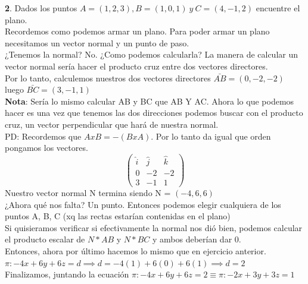 \documentclass[10pt,a4paper]{article}
\begin{document}
\textbf{2}. Dados los puntos $A=(1, 2, 3), B=(1,0,1) \ y \ C=(4, -1, 2)$ encuentre el plano. \\
Recordemos como podemos armar un plano. Para poder armar un plano necesitamos un vector normal y un punto de paso. \\
¿Tenemos la normal? No. ¿Como podemos calcularla? La manera de calcular un vector normal sería hacer el producto cruz entre dos vectores directores. \\
Por lo tanto, calculemos nuestros dos vectores directores $ \bar{AB} = (0, -2, -2)$ luego $\bar{BC} = (3, -1, 1)$ \\
\textbf{Nota}: Sería lo mismo calcular AB y BC que AB Y AC.
Ahora lo que podemos hacer es una vez que tenemos las dos direcciones podemos buscar con el producto cruz, un vector perpendicular que hará de nuestra normal. \\
PD: Recordemos que $A x B = - (B x A)$. Por lo tanto da igual que orden pongamos los vectores.
\[
\begin{pmatrix}
\hat{i} & \hat{j} & \hat{k} \\
0 & -2 & -2\\
3 & -1 & 1
\end{pmatrix}
\]
Nuestro vector normal N termina siendo N = $(-4, 6, 6)$ \\
¿Ahora qué nos falta? Un punto. Entonces podemos elegir cualquiera de los puntos A, B, C (xq las rectas estarían contenidas en el plano) \\
Si quisieramos verificar si efectivamente la normal nos dió bien, podemos calcular el producto escalar de $N * AB$ y $N * BC$ y ambos deberían dar 0. \\
Entonces, ahora por último hacemos lo mismo que en ejercicio anterior. $\pi:-4x+6y+6z=d \implies d=-4(1)+6(0)+6(1) \implies d = 2$ \\
Finalizamos, juntando la ecuación $\pi:-4x+6y+6z=2 \equiv \pi:-2x+3y+3z=1$ 
\end{document}
